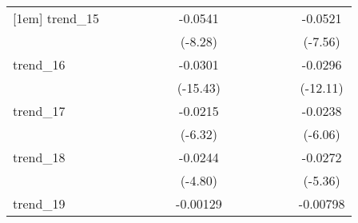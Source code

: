 {\begin{tabular}{l*{12}{c}}
[1em]
trend\_15    &                     &                     &                     &                     &                     &     -0.0541\sym{***}&                     &                     &                     &                     &                     &     -0.0521\sym{***}\\
            &                     &                     &                     &                     &                     &     (-8.28)         &                     &                     &                     &                     &                     &     (-7.56)         \\
[1em]
trend\_16    &                     &                     &                     &                     &                     &     -0.0301\sym{***}&                     &                     &                     &                     &                     &     -0.0296\sym{***}\\
            &                     &                     &                     &                     &                     &    (-15.43)         &                     &                     &                     &                     &                     &    (-12.11)         \\
[1em]
trend\_17    &                     &                     &                     &                     &                     &     -0.0215\sym{***}&                     &                     &                     &                     &                     &     -0.0238\sym{***}\\
            &                     &                     &                     &                     &                     &     (-6.32)         &                     &                     &                     &                     &                     &     (-6.06)         \\
[1em]
trend\_18    &                     &                     &                     &                     &                     &     -0.0244\sym{***}&                     &                     &                     &                     &                     &     -0.0272\sym{***}\\
            &                     &                     &                     &                     &                     &     (-4.80)         &                     &                     &                     &                     &                     &     (-5.36)         \\
[1em]
trend\_19    &                     &                     &                     &                     &                     &    -0.00129         &                     &                     &                     &                     &                     &    -0.00798         \\

\end{tabular}}

